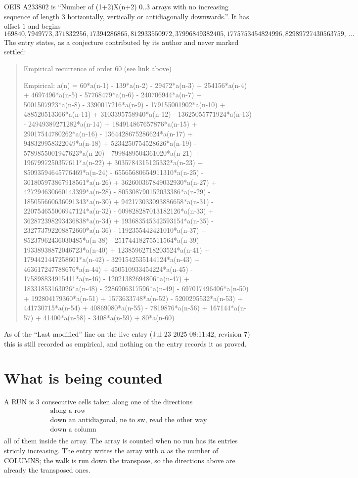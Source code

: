 \documentclass[11pt,a4paper]{article}
\theoremstyle{plain}
\theoremstyle{definition}
\begin{document}
OEIS A233802 is ``Number of (1+2)X(n+2) 0..3 arrays with no increasing sequence of length 3 horizontally, vertically or antidiagonally downwards.''. It has offset $1$ and begins
\[
169840, 7949773, 371832256, 17394286865, 812933550972, 37996849382405, 1775753454824996, 82989727430563759,\ \dots
\]
The entry states, as a conjecture contributed by its author and never marked settled:
\begin{quote}
Empirical recurrence of order 60 (see link above)

Empirical: a(n) = 60*a(n-1) - 139*a(n-2) - 29472*a(n-3) + 254156*a(n-4) + 4697496*a(n-5) - 57768479*a(n-6) - 240706944*a(n-7) + 5001507923*a(n-8) - 3390017216*a(n-9) - 179155001902*a(n-10) + 488520513366*a(n-11) + 3103395758940*a(n-12) - 13625055771924*a(n-13) - 24949389271282*a(n-14) + 184914867657876*a(n-15) + 29017544780262*a(n-16) - 1364428675286624*a(n-17) + 948329958322049*a(n-18) + 5234250754528626*a(n-19) - 5789855001947623*a(n-20) - 7998489504361020*a(n-21) + 1967997250357611*a(n-22) + 3035784315125332*a(n-23) + 85093594645776469*a(n-24) - 65565680654911310*a(n-25) - 301805973867918561*a(n-26) + 362600367849032930*a(n-27) + 427294630660143399*a(n-28) - 805308790152033386*a(n-29) - 185055660636091343*a(n-30) + 942173033093886658*a(n-31) - 220754655006947124*a(n-32) - 609828287013182126*a(n-33) + 362872398293436838*a(n-34) + 193683545342593154*a(n-35) - 232773792208872660*a(n-36) - 1192355442421010*a(n-37) + 85237962436030485*a(n-38) - 25174418275511564*a(n-39) - 19338938872046723*a(n-40) + 12385962718203524*a(n-41) + 1794421447258601*a(n-42) - 3291542535144124*a(n-43) + 463617247788676*a(n-44) + 450510933454224*a(n-45) - 175898834915411*a(n-46) - 12021382694806*a(n-47) + 18331853163026*a(n-48) - 2286906317596*a(n-49) - 697017496406*a(n-50) + 192804179360*a(n-51) + 1573633748*a(n-52) - 5200295532*a(n-53) + 441730715*a(n-54) + 40869080*a(n-55) - 7819876*a(n-56) + 167144*a(n-57) + 41400*a(n-58) - 3408*a(n-59) + 80*a(n-60)
\end{quote}
As of the ``Last modified'' line on the live entry (Jul 23 2025 08:11:42, revision 7) this is still
recorded as empirical, and nothing on the entry records it as proved.

\section{What is being counted}

A RUN is $3$ consecutive cells taken along one of the directions
\[
\begin{array}{l}
\text{along a row} \\
\text{down an antidiagonal, ne to sw, read the other way} \\
\text{down a column} \\
\end{array}
\]
all of them inside the array. The array is counted when no run has its entries strictly increasing. The entry writes the array with $n$ as the number of COLUMNS; the walk is run down the transpose, so the directions above are already the transposed ones.
\end{document}
